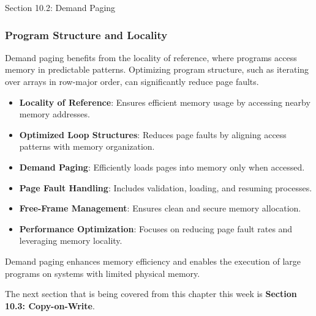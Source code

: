 \begin{notes}{Section 10.2: Demand Paging}
    \subsubsection*{Program Structure and Locality}
    
    Demand paging benefits from the locality of reference, where programs access memory in predictable patterns. Optimizing program structure, such as iterating over arrays in row-major order, can 
    significantly reduce page faults.
    
    \begin{highlight}
    \begin{itemize}
        \item \textbf{Locality of Reference}: Ensures efficient memory usage by accessing nearby memory addresses.
        \item \textbf{Optimized Loop Structures}: Reduces page faults by aligning access patterns with memory organization.
    \end{itemize}
    \end{highlight}
    
    \begin{highlight}
    \begin{itemize}
        \item \textbf{Demand Paging}: Efficiently loads pages into memory only when accessed.
        \item \textbf{Page Fault Handling}: Includes validation, loading, and resuming processes.
        \item \textbf{Free-Frame Management}: Ensures clean and secure memory allocation.
        \item \textbf{Performance Optimization}: Focuses on reducing page fault rates and leveraging memory locality.
    \end{itemize}
    Demand paging enhances memory efficiency and enables the execution of large programs on systems with limited physical memory.
    \end{highlight}
\end{notes}

The next section that is being covered from this chapter this week is \textbf{Section 10.3: Copy-on-Write}.

